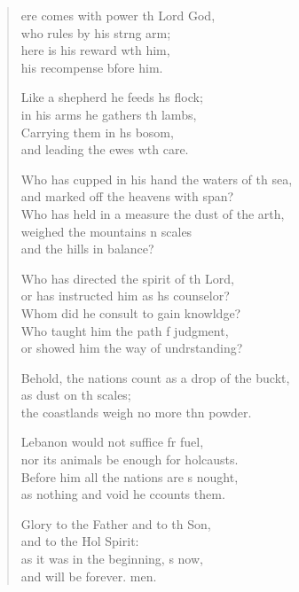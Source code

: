 \settowidth{\versewidth}{Behold, the nations count as a drop of the bucket, +}
\begin{verse}%
  \begin{patverse}
ere comes with power th Lord God,\Med\\
who rules by his strng arm;\\
here is his reward w\pointup{\i}th him,\Med\\
his recompense bfore him.

Like a shepherd he feeds h\pointup{\i}s flock;\Med\\
in his arms he gathers th lambs,\\
Carrying them in h\pointup{\i}s bosom,\Med\\
and leading the ewes w\pointup{\i}th care.

Who has cupped in his hand the waters of th sea,\Med\\
and marked off the heavens with  span?\\
Who has held in a measure the dust of the arth,\Flex\\
weighed the mountains \pointup{\i}n scales\Med\\
and the hills in  balance?

Who has directed the spirit of th Lord,\Med\\
or has instructed him as h\pointup{\i}s counselor?\\
Whom did he consult to gain knowldge?\Flex\\
Who taught him the path f judgment,\Med\\
or showed him the way of undrstanding?

Behold, the nations count as a drop of the buckt,\Flex\\
as dust on th scales;\Med\\
the coastlands weigh no more thn powder.

Lebanon would not suffice fr fuel,\Med\\
nor its animals be enough for holcausts.\\
Before him all the nations are s nought,\Med\\
as nothing and void he ccounts them.

Glory to the Father and to th Son,\Med\\
and to the Hol Spirit:\\
as it was in the beginning, \pointup{\i}s now,\Med\\
and will be forever. men.
  \end{patverse}
\end{verse}
